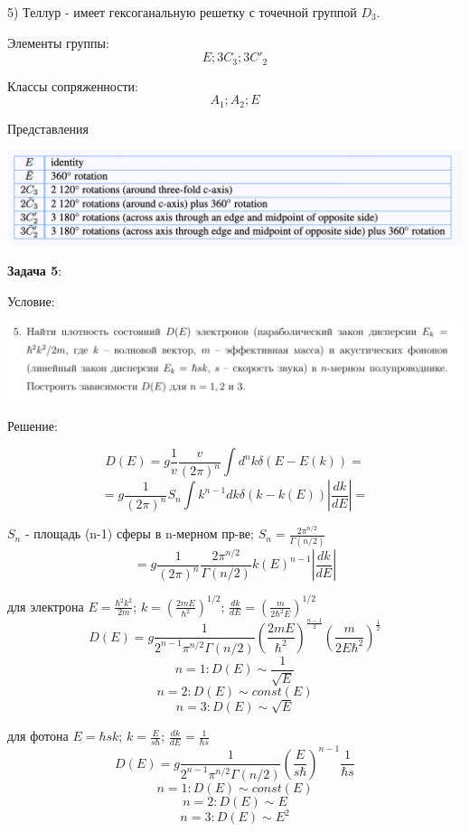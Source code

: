 \documentclass[12pt]{article}
\begin{document}
\begin{large}
\par 5) Теллур - имеет гексоганальную решетку с точечной группой $D_{3}$.
\par Элементы группы:
\[
    E; 3C_3; 3C'_2
\]
\par Классы сопряженности:
\[
    A_{1}; A_{2}; E
\]
\par Представления
\par
\includegraphics[width=1\textwidth]{D_3.png}
\par

\par
\par \textbf{Задача 5}:
\par Условие:
\par
\includegraphics[width=1\textwidth]{photo_5.png}
\par Решение:
\par
\[
    D(E) = g \frac{1}{v} \frac{v}{(2\pi)^n} \int d^{n}k \delta (E-E(k)) =
\]
\[
    = g \frac{1}{(2\pi)^n} S_n \int k^{n-1}dk \delta (k-k(E)) \left| \frac{dk}{dE} \right| =
\]
\par $S_n$ - площадь (n-1) сферы в n-мерном пр-ве; $S_n = \frac{2 \pi^{n/2}}{\Gamma (n/2)}$
\[
    = g \frac{1}{(2\pi)^n} \frac{2\pi^{n/2}}{\Gamma (n/2)} k(E)^{n-1} \left| \frac{dk}{dE} \right|
\]
\par для электрона $E = \frac{\hbar^2 k^2}{2m}$; $k = \left( \frac{2mE}{\hbar^2} \right)^{1/2}$; $\frac{dk}{dE} = \left( \frac{m}{2\hbar^2 E} \right)^{1/2}$
\[
    D(E) = g \frac{1}{2^{n-1} \pi^{n/2} \Gamma (n/2)} \left( \frac{2mE}{\hbar^2} \right)^{\frac{n-1}{2}} \left( \frac{m}{2E\hbar^2} \right)^{\frac{1}{2}}
\]
\[
    n=1: D(E) \sim \frac{1}{\sqrt{E}}
\]
\[
    n=2: D(E) \sim const(E)
\]
\[
    n=3: D(E) \sim \sqrt{E}
\]
\par для фотона $E = \hbar s k$; $k = \frac{E}{s \hbar}$; $\frac{dk}{dE} = \frac{1}{\hbar s}$
\[
    D(E) = g \frac{1}{2^{n-1} \pi^{n/2} \Gamma (n/2)} \left( \frac{E}{s \hbar} \right)^{n-1} \frac{1}{\hbar s}
\]
\[
    n=1: D(E) \sim const(E)
\]
\[
    n=2: D(E) \sim E
\]
\[
    n=3: D(E) \sim E^2
\]
\par


\end{large}
\end{document}
